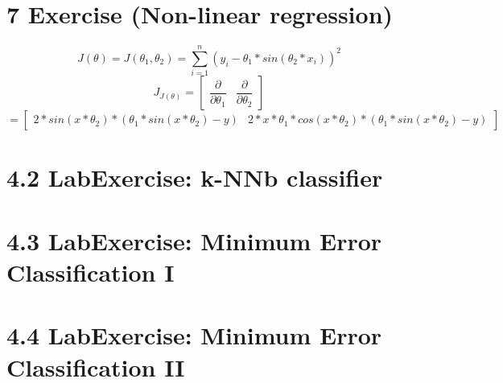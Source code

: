 \documentclass[pdftex,12pt,a4paper]{article}
\begin{document}


\section*{7 Exercise (Non-linear regression)}
$$J(\theta) = J(\theta_1, \theta_2) = \sum\limits_{i=1}^n(y_i - \theta_1 * sin(\theta_2 * x_i))^2$$
$$J_{J(\theta)} = \begin{bmatrix}	\dfrac{\partial}{\partial \theta_1} & \dfrac{\partial}{\partial \theta_2} \end{bmatrix}$$
$$ = \begin{bmatrix}
2 * sin(x * \theta_2) * (\theta_1 * sin(x * \theta_2) - y) & 2 * x * \theta_1 * cos(x * \theta_2) * (\theta_1 * sin(x * \theta_2) - y)
\end{bmatrix}$$

\section*{4.2 LabExercise: k-NNb classifier}
\section*{4.3 LabExercise: Minimum Error Classification I}
\section*{4.4 LabExercise: Minimum Error Classification II}	
\end{document}
